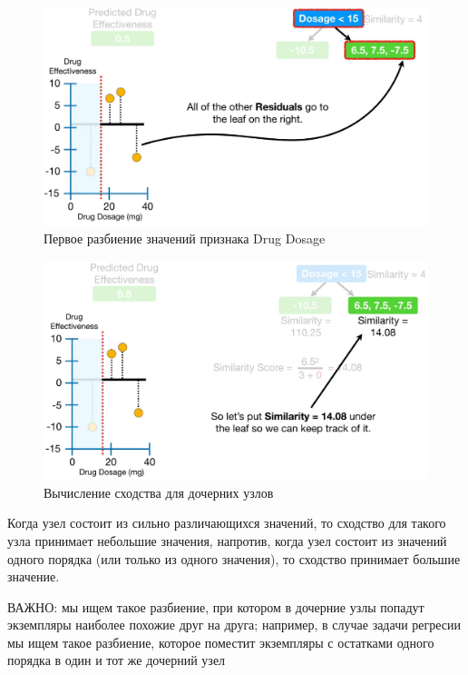 \documentclass[%
	11pt,
	a4paper,
	utf8,
		]{article}
\begin{document}
\begin{figure}[h]
	\centering
	\includegraphics[scale=0.35]{figures/xgboost_split1.png}
	\caption{ Первое разбиение значений признака Drug Dosage }\label{fig:xgboost_split1}
\end{figure}

\begin{figure}[h]
	\centering
	\includegraphics[scale=0.35]{figures/xgboost_similarity_leaf1.png}
	\caption{ Вычисление сходства для дочерних узлов }\label{fig:xgboost_similarity_leaf1}
\end{figure}

Когда узел состоит из сильно различающихся значений, то сходство для такого узла принимает небольшие значения, напротив, когда узел состоит из значений одного порядка (или только из одного значения), то сходство принимает большие значение.

ВАЖНО: мы ищем такое разбиение, при котором в дочерние узлы попадут экземпляры наиболее похожие друг на друга; например, в случае задачи регресии мы ищем такое разбиение, которое поместит экземпляры с остатками одного порядка в один и тот же дочерний узел
\end{document}
